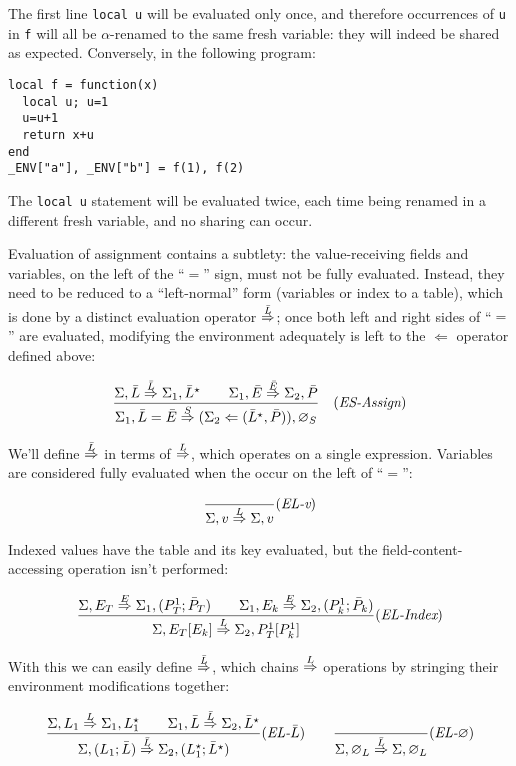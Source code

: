 \noindent
The first line {\tt local u} will be evaluated only once, and
therefore occurrences of {\tt u} in {\tt f} will all be
$\alpha$-renamed to the same fresh variable: they will indeed be
shared as expected. Conversely, in the following program:

\begin{verbatim}
local f = function(x)
  local u; u=1
  u=u+1
  return x+u
end
_ENV["a"], _ENV["b"] = f(1), f(2)
\end{verbatim}

The {\tt local u} statement will be evaluated twice, each time being
renamed in a different fresh variable, and no sharing can occur.

Evaluation of assignment contains a subtlety: the value-receiving
fields and variables, on the left of the ``$=$'' sign, must not be
fully evaluated. Instead, they need to be reduced to a ``left-normal''
form (variables or index to a table), which is done by a distinct
evaluation operator $\stackrel{\bar L}{\Rightarrow}$; once both left and right sides of
``$=$'' are evaluated, modifying the environment adequately is left to
the $\Leftarrow$ operator defined above:

$$
\frac{
\Sigma, \bar L \stackrel{\bar L}{\Rightarrow} \Sigma_1, \bar L^\star
\qquad
\Sigma_1, \bar E \stackrel{\bar E}{\Rightarrow} \Sigma_2, \bar P
}{
\Sigma_1, \bar L = \bar E
\stackrel{S}{\Rightarrow}
(\Sigma_2\Leftarrow (\bar L^\star, \bar P)), \varnothing_S
}\quad(\textit{ES-Assign})
$$

We'll define $\stackrel{\bar L}{\Rightarrow}$ in terms of $\stackrel{L}{\Rightarrow}$, which operates on
a single expression. Variables are considered fully evaluated when the
occur on the left of ``$=$'':

$$
\frac{
}{
\Sigma, v \stackrel{L}{\Rightarrow} \Sigma, v
}(\textit{EL-v})$$

Indexed values have the table and its key evaluated, but the
field-content-accessing operation isn't performed:

$$
\frac{
\Sigma, E_T \stackrel{E}{\Rightarrow} \Sigma_1, (P_T^1;\bar P_T)
\qquad
\Sigma_1, E_k \stackrel{E}{\Rightarrow} \Sigma_2, (P_k^1;\bar P_k)
}{
\Sigma, E_T[E_k] \stackrel{L}{\Rightarrow} \Sigma_2, P_T^1[P_k^1]
}(\textit{EL-Index})$$

With this we can easily define $\stackrel{\bar L}{\Rightarrow}$, which chains $\stackrel{L}{\Rightarrow}$
operations by stringing their environment modifications together:

$$
\frac{
\Sigma, L_1 \stackrel{L}{\Rightarrow} \Sigma_1, L_1^\star
\qquad
\Sigma_1, \bar L \stackrel{\bar L}{\Rightarrow} \Sigma_2, \bar L^\star
}{
\Sigma, (L_1;\bar L) \stackrel{\bar L}{\Rightarrow} \Sigma_2, (L_1^\star; \bar L^\star)
}(\textit{EL-$\bar L$})
\qquad
\frac{}{\Sigma, \varnothing_L \stackrel{\bar L}{\Rightarrow} \Sigma, \varnothing_L}
(\textit{EL-$\varnothing$})
$$

